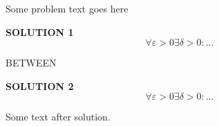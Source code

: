 \documentclass{article}
\begin{document}
  Some problem text goes here
\begin{tcolorbox}
  \begin{solution}
    \textbf{SOLUTION 1}
    \[ \forall\varepsilon>0\exists\delta>0:\dots \]
\end{solution}
\end{tcolorbox}

  BETWEEN
\begin{tcolorbox}
\begin{solution}
    \textbf{SOLUTION 2}
    \[ \forall\varepsilon>0\exists\delta>0:\dots \]
\end{solution}
\end{tcolorbox}
  Some text after solution.
\end{document}
